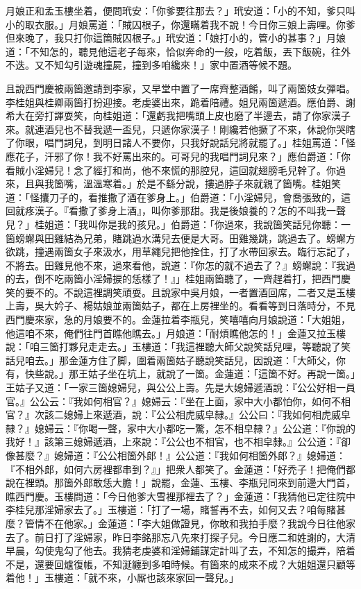 月娘正和孟玉樓坐着，便問玳安：「你爹要往那去？」玳安道：「小的不知，爹只叫小的取衣服。」月娘罵道：「賊囚根子，你還瞞着我不說！今日你三娘上壽哩。你爹但來晚了，我只打你這箇賊囚根子。」玳安道：「娘打小的，管小的甚事？」月娘道：「不知怎的，聽見他這老子每來，恰似奔命的一般，吃着飯，丟下飯碗，往外不迭。又不知勾引遊魂撞屍，撞到多咱纔來！」家中置酒等候不題。

且說西門慶被兩箇邀請到李家，又早堂中置了一席齊整酒餚，叫了兩箇妓女彈唱。李桂姐與桂卿兩箇打扮迎接。老虔婆出來，跪着陪禮。姐兒兩箇遞酒。應伯爵、謝希大在旁打諢耍笑，向桂姐道：「還虧我把嘴頭上皮也磨了半邊去，請了你家漢子來。就連酒兒也不替我遞一盃兒，只遞你家漢子！剛纔若他撅了不來，休說你哭瞎了你眼，{}唱門詞兒，到明日諸人不要你，只我好說話兒將就罷了。」桂姐罵道：「怪應花子，汗邪了你！我不好罵出來的。可哥兒的我唱門詞兒來？」應伯爵道：「你看賊小淫婦兒！念了經打和尚，他不來慌的那腔兒，這回就翅膀毛兒幹了。你過來，且與我箇嘴，溫溫寒着。」於是不繇分說，摟過脖子來就親了箇嘴。桂姐笑道：「怪攮刀子的，看推撒了酒在爹身上。」伯爵道：「小淫婦兒，會喬張致的，這回就疼漢子。『看撒了爹身上酒』，叫你爹那甜。我是後娘養的？怎的不叫我一聲兒？」桂姐道：「我叫你是我的孩兒。」伯爵道：「你過來，我說箇笑話兒你聽：一箇螃蠏與田雞結為兄弟，賭跳過水溝兒去便是大哥。田雞幾跳，跳過去了。螃蠏方欲跳，撞遇兩箇女子來汲水，用草繩兒把他拴住，打了水帶回家去。臨行忘記了，不將去。田雞見他不來，過來看他，說道：『你怎的就不過去了？』螃蠏說：『我過的去，倒不吃兩箇小淫婦捩的恁樣了！』」桂姐兩箇聽了，一齊趕着打，把西門慶笑的要不的。不說這裡調笑頑耍。且說家中吳月娘，一者置酒回席，二者又是玉樓上壽，吳大妗子、楊姑娘並兩箇姑子，都在上房裡坐的。看看等到日落時分，不見西門慶來家，急的月娘要不的。金蓮拉着李瓶兒，笑嘻嘻向月娘說道：「大姐姐，他這咱不來，俺們往門首瞧他瞧去。」月娘道：「耐煩瞧他怎的！」{}金蓮又拉玉樓說：「咱三箇打夥兒走走去。」玉樓道：「我這裡聽大師父說笑話兒哩，等聽說了笑話兒咱去。」那金蓮方住了脚，圍着兩箇姑子聽說笑話兒，因說道：「大師父，你有，快些說。」那王姑子坐在坑上，就說了一箇。金蓮道：「這箇不好。再說一箇。」{}王姑子又道：「一家三箇媳婦兒，與公公上壽。先是大媳婦遞酒說：『公公好相一員官。』公公云：『我如何相官？』媳婦云：『坐在上面，家中大小都怕你，如何不相官？』次該二媳婦上來遞酒，說：『公公相虎威皁隸。』公公曰：『我如何相虎威皁隸？』媳婦云：『你喝一聲，家中大小都吃一驚，怎不相皁隸？』公公道：『你說的我好！』該第三媳婦遞酒，上來說：『公公也不相官，也不相皁隸。』公公道：『卻像甚麼？』媳婦道：『公公相箇外郎！』公公道：『我如何相箇外郎？』媳婦道：『不相外郎，如何六房裡都串到？』」{}把衆人都笑了。金蓮道：「好禿子！把俺們都說在裡頭。那箇外郎敢恁大膽！」說罷，金蓮、玉樓、李瓶兒同來到前邊大門首，瞧西門慶。玉樓問道：「今日他爹大雪裡那裡去了？」金蓮道：「我猜他已定往院中李桂兒那淫婦家去了。」玉樓道：「打了一場，賭誓再不去，如何又去？咱每賭甚麼？管情不在他家。」金蓮道：「李大姐做證見，你敢和我拍手麼？我說今日往他家去了。前日打了淫婦家，昨日李銘那忘八先來打探子兒。{}今日應二和姓謝的，大清早晨，勾使鬼勾了他去。我猜老虔婆和淫婦鋪謀定計叫了去，不知怎的撮弄，陪着不是，還要回爐復帳，不知涎纏到多咱時候。有箇來的成來不成？大姐姐還只顧等着他！」玉樓道：「就不來，小厮也該來家回一聲兒。」

